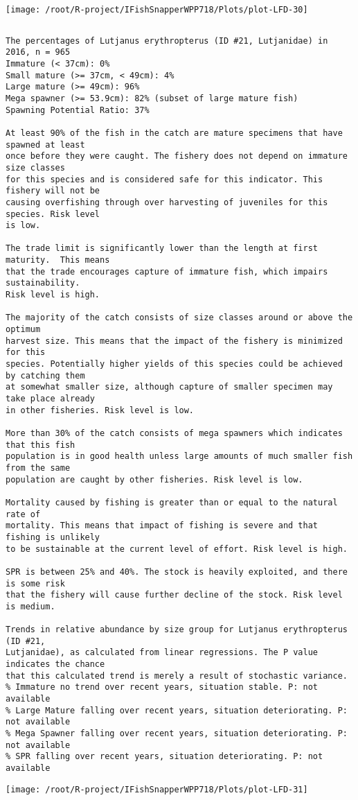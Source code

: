 \documentclass{report}\usepackage[]{graphicx}\usepackage[]{color}
\makeatletter
\def\maxwidth{ %
  \ifdim\Gin@nat@width>\linewidth
    \linewidth
  \else
    \Gin@nat@width
  \fi
}
\newenvironment{kframe}{%
 \def\at@end@of@kframe{}%
 \ifinner\ifhmode%
  \def\at@end@of@kframe{\end{minipage}}%
  \begin{minipage}{\columnwidth}%
 \fi\fi%
 \def\FrameCommand##1{\hskip\@totalleftmargin \hskip-\fboxsep
 \colorbox{shadecolor}{##1}\hskip-\fboxsep
     \hskip-\linewidth \hskip-\@totalleftmargin \hskip\columnwidth}%
 \MakeFramed {\advance\hsize-\width
   \@totalleftmargin\z@ \linewidth\hsize
   \@setminipage}}%
 {\par\unskip\endMakeFramed%
 \at@end@of@kframe}
\newenvironment{knitrout}{}{} %
\makeatother
\begin{document}
\begin{knitrout}
\texttt{[image: /root/R-project/IFishSnapperWPP718/Plots/plot-LFD-30]} 
\begin{kframe}\begin{verbatim}
\end{verbatim}
\end{kframe}
\clearpage
\newpage
\begin{kframe}\begin{verbatim}The percentages of Lutjanus erythropterus (ID #21, Lutjanidae) in 2016, n = 965
Immature (< 37cm): 0%
Small mature (>= 37cm, < 49cm): 4%
Large mature (>= 49cm): 96%
Mega spawner (>= 53.9cm): 82% (subset of large mature fish)
Spawning Potential Ratio: 37%
 
At least 90% of the fish in the catch are mature specimens that have spawned at least
once before they were caught. The fishery does not depend on immature size classes
for this species and is considered safe for this indicator. This fishery will not be
causing overfishing through over harvesting of juveniles for this species. Risk level
is low.

The trade limit is significantly lower than the length at first maturity.  This means
that the trade encourages capture of immature fish, which impairs sustainability.
Risk level is high.

The majority of the catch consists of size classes around or above the optimum
harvest size. This means that the impact of the fishery is minimized for this
species. Potentially higher yields of this species could be achieved by catching them
at somewhat smaller size, although capture of smaller specimen may take place already
in other fisheries. Risk level is low.

More than 30% of the catch consists of mega spawners which indicates that this fish
population is in good health unless large amounts of much smaller fish from the same
population are caught by other fisheries. Risk level is low.
 
Mortality caused by fishing is greater than or equal to the natural rate of
mortality. This means that impact of fishing is severe and that fishing is unlikely
to be sustainable at the current level of effort. Risk level is high.
 
SPR is between 25% and 40%. The stock is heavily exploited, and there is some risk
that the fishery will cause further decline of the stock. Risk level is medium.
 
Trends in relative abundance by size group for Lutjanus erythropterus (ID #21,
Lutjanidae), as calculated from linear regressions. The P value indicates the chance
that this calculated trend is merely a result of stochastic variance.
% Immature no trend over recent years, situation stable. P: not available
% Large Mature falling over recent years, situation deteriorating. P: not available
% Mega Spawner falling over recent years, situation deteriorating. P: not available
% SPR falling over recent years, situation deteriorating. P: not available
\end{verbatim}
\end{kframe}
\texttt{[image: /root/R-project/IFishSnapperWPP718/Plots/plot-LFD-31]} 


\end{knitrout}
\end{document}
